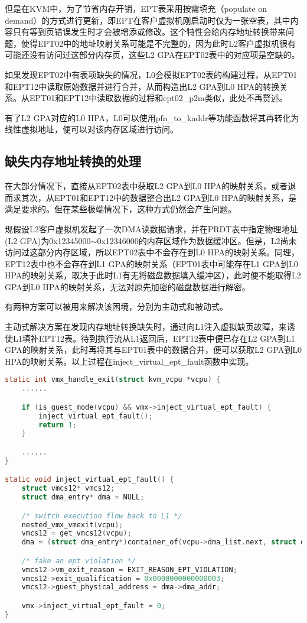但是在KVM中，为了节省内存开销，EPT表采用按需填充（populate on demand）的方式进行更新，即EPT在客户虚拟机刚启动时仅为一张空表，其中内容只有等到页错误发生时才会被增添或修改。这个特性会给内存地址转换带来问题，使得EPT02中的地址映射关系可能是不完整的，因为此时L2客户虚拟机很有可能还没有访问过这部分内存页，这些L2 GPA在EPT02表中的对应项是空缺的。

如果发现EPT02中有表项缺失的情况，L0会模拟EPT02表的构建过程，从EPT01和EPT12中读取原始数据并进行合并，从而构造出L2 GPA到L0 HPA的转换关系。从EPT01和EPT12中读取数据的过程和ept02\_p2m类似，此处不再赘述。

有了L2 GPA对应的L0 HPA，L0可以使用pfn\_to\_kaddr等功能函数将其再转化为线性虚拟地址，便可以对该内存区域进行访问。

\subsection{缺失内存地址转换的处理}

在大部分情况下，直接从EPT02表中获取L2 GPA到L0 HPA的映射关系，或者退而求其次，从EPT01和EPT12中的数据整合出L2 GPA到L0 HPA的映射关系，是满足要求的。但在某些极端情况下，这种方式仍然会产生问题。

现假设L2客户虚拟机发起了一次DMA读数据请求，并在PRDT表中指定物理地址(L2 GPA)为0x12345000$\sim$0x12346000的内存区域作为数据缓冲区。但是，L2尚未访问过这部分内存区域，所以EPT02表中不会存在到L0 HPA的映射关系。同理，EPT12表中也不会存在到L1 GPA的映射关系（EPT01表中可能存在L1 GPA到L0 HPA的映射关系，取决于此时L1有无将磁盘数据填入缓冲区），此时便不能取得L2 GPA到L0 HPA的映射关系，无法对原先加密的磁盘数据进行解密。

有两种方案可以被用来解决该困境，分别为主动式和被动式。

主动式解决方案在发现内存地址转换缺失时，通过向L1注入虚拟缺页故障，来诱使L1填补EPT12表。待到执行流从L1返回后，EPT12表中便已存在L2 GPA到L1 GPA的映射关系，此时再将其与EPT01表中的数据合并，便可以获取L2 GPA到L0 HPA的映射关系。以上过程在inject\_virtual\_ept\_fault函数中实现。

\begin{lstlisting}[language={C}, caption={inject\_virtual\_ept\_fault实现源代码}]
static int vmx_handle_exit(struct kvm_vcpu *vcpu) {
	......

    if (is_guest_mode(vcpu) && vmx->inject_virtual_ept_fault) {
        inject_virtual_ept_fault();
        return 1;
    }

	......
}

static void inject_virtual_ept_fault() {	
    struct vmcs12* vmcs12;
    struct dma_entry* dma = NULL;

    /* switch execution flow back to L1 */
    nested_vmx_vmexit(vcpu);
    vmcs12 = get_vmcs12(vcpu);
    dma = (struct dma_entry*)container_of(vcpu->dma_list.next, struct dma_entry, next_entry);

    /* fake an ept violation */
    vmcs12->vm_exit_reason = EXIT_REASON_EPT_VIOLATION;
    vmcs12->exit_qualification = 0x0000000000000003;
    vmcs12->guest_physical_address = dma->dma_addr;

    vmx->inject_virtual_ept_fault = 0;
}
\end{lstlisting}

